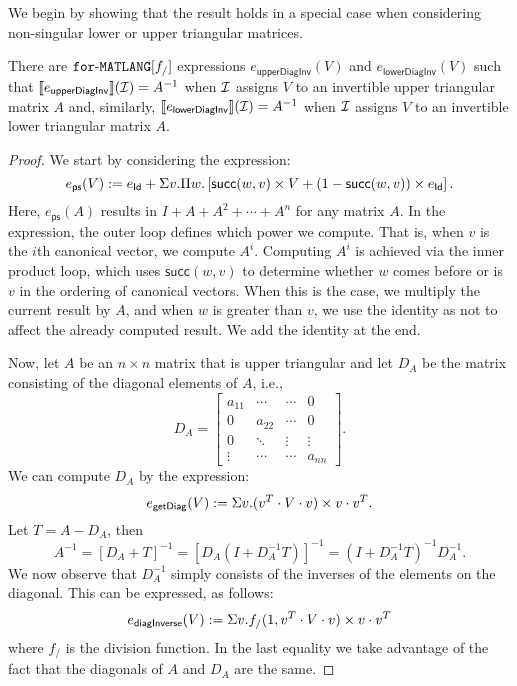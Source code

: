 
We begin by showing that the result holds in a special case when considering non-singular lower or upper triangular matrices.
\begin{lemma}\label{prop:upperlowerinverse}
There are $\texttt{for}\text{-}\texttt{MATLANG}[f_/]$ expressions $e_{\mathsf{upperDiagInv}}(V)$ and $e_{\mathsf{lowerDiagInv}}(V)$
such that $\llbracket e_{\mathsf{upperDiagInv}} \rrbracket(\mathcal{I})=A^{-1}$ when $\mathcal{I}$ assigns $V$
to an invertible upper triangular matrix $A$ and, similarly, $\llbracket e_{\mathsf{lowerDiagInv}} \rrbracket(\mathcal{I})=A^{-1}$ when $\mathcal{I}$ assigns $V$
to an invertible lower triangular matrix $A$.
\end{lemma}

\begin{proof} We start by considering the expression:
    $$
    e_{\mathsf{ps}}(V):= e_{\mathsf{Id}} + \Sigma v.\Pi w. \left[ \mathsf{succ}(w,v)\times V + (1 - \mathsf{succ}(w,v))\times e_{\mathsf{Id}} \right].
    $$
    Here, $e_{\mathsf{ps}}(A)$ results in $I+A+A^2+\cdots + A^n$ for any matrix $A$. In the expression, the outer loop defines which power we compute. 
    That is, when $v$ is the $i$th canonical vector, we compute $A^i$.
    Computing $A^i$ is achieved via the inner product loop, which uses $\mathsf{succ}(w,v)$ to 
    determine whether $w$ comes before or is $v$ in the ordering of canonical vectors.
    When this is the case, we multiply the current result by $A$, and when $w$ is greater 
    than $v$, we use the identity as not to affect the already computed result. We add the identity at the end.

    Now, let $A$ be an $n\times n$ matrix that is upper triangular and let $D_A$ be the matrix consisting of the diagonal elements of $A$, i.e.,
    \[
    D_A = \begin{bmatrix}
        a_{11} & \cdots & \cdots &  0 \\
        0 & a_{22} & \cdots &  0 \\
        0 & \ddots & \vdots & \vdots \\
        \vdots & \cdots& \cdots & a_{nn}
    \end{bmatrix}.
    \]
    We can compute $D_A$ by the expression:
    $$
    e_{\mathsf{getDiag}}(V) := \Sigma v. (v^T\cdot V\cdot v) \times v\cdot v^T.
    $$
    Let $T=A-D_A$, then
    $$
    A^{-1}=\left[ D_A+T \right]^{-1}= \left[ D_A\left( I+D_A^{-1}T\right) \right]^{-1} = \left( I+D_A^{-1}T\right)^{-1}D_A^{-1}.
    $$
    We now observe that $D_{A}^{-1}$ simply consists of the inverses of the elements on the diagonal. This can be expressed, as follows:
    $$
    e_{\mathsf{diagInverse}}(V):=\Sigma v. f_{/}(1,v^T\cdot V\cdot v)\times v\cdot v^T
    $$
    where $f_{/}$ is the division function. In the last equality we take advantage of the fact that the diagonals of $A$ and $D_A$ are the same.


\end{proof}
